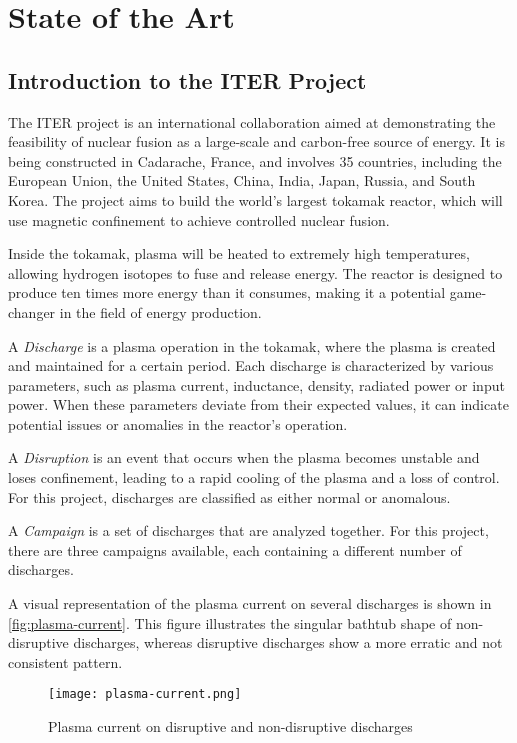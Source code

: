 \chapter{State of the Art} \label{sec:cap2}

\section{Introduction to the \acs{ITER} Project}

The \ac{ITER} project is an international collaboration aimed at demonstrating the feasibility of nuclear fusion as a large-scale and carbon-free source of energy. It is being constructed in Cadarache, France, and involves 35 countries, including the European Union, the United States, China, India, Japan, Russia, and South Korea. The project aims to build the world's largest tokamak reactor, which will use magnetic confinement to achieve controlled nuclear fusion.

Inside the tokamak, plasma will be heated to extremely high temperatures, allowing hydrogen isotopes to fuse and release energy. The reactor is designed to produce ten times more energy than it consumes, making it a potential game-changer in the field of energy production.

A \textit{Discharge} is a plasma operation in the tokamak, where the plasma is created and maintained for a certain period. Each discharge is characterized by various parameters, such as plasma current, inductance, density, radiated power or input power. When these parameters deviate from their expected values, it can indicate potential issues or anomalies in the reactor's operation.

A \textit{Disruption} is an event that occurs when the plasma becomes unstable and loses confinement, leading to a rapid cooling of the plasma and a loss of control. For this project, discharges are classified as either normal or anomalous.

A \textit{Campaign} is a set of discharges that are analyzed together. For this project, there are three campaigns available, each containing a different number of discharges.

A visual representation of the plasma current on several discharges is shown in \autoref{fig:plasma-current}. This figure illustrates the singular bathtub shape of non-disruptive discharges, whereas disruptive discharges show a more erratic and not consistent pattern.

\begin{figure}[H]
    \centering
    \texttt{[image: plasma-current.png]}
    \caption{Plasma current on disruptive and non-disruptive discharges}
    \label{fig:plasma-current}
\end{figure}

